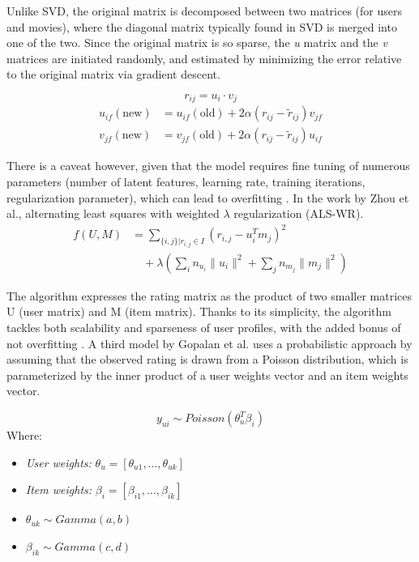 \documentclass[conference]{IEEEtran}
\begin{document}
Unlike SVD, the original matrix is decomposed between two matrices (for users and movies), where the diagonal matrix typically found in SVD is merged into one of the two. Since the original matrix is so sparse, the \textit{u} matrix and the \textit{v} matrices are initiated randomly, and estimated by minimizing the error relative to the original matrix via gradient descent.

\begin{equation}
r_{ij} = u_i \cdot v_j
\end{equation}
\begin{align}
u_{if}(\text{new}) &= u_{if}(\text{old}) + 2\alpha(r_{ij} - \tilde{r}_{ij})v_{jf} \\
v_{jf}(\text{new}) &= v_{jf}(\text{old}) + 2\alpha(r_{ij} - \tilde{r}_{ij})u_{if}
\end{align}

There is a caveat however, given that the model requires fine tuning of numerous parameters (number of latent features, learning rate, training iterations, regularization parameter), which can lead to overfitting \cite{Funk2006}. In the work by Zhou et al., alternating least squares with weighted  $\lambda$ regularization (ALS-WR). 
\begin{align}
f(U, M) &= \sum_{\{i, j\} | r_{i,j} \in I} \left( r_{i,j} - u_i^T m_j \right)^2 \nonumber \\
&\quad + \lambda \left( \sum_i n_{u_i} \| u_i \|^2 + \sum_j n_{m_j} \| m_j \|^2 \right)
\end{align}

The algorithm expresses the rating matrix as the product of two smaller matrices U (user matrix) and M (item matrix). Thanks to its simplicity, the algorithm tackles both scalability and sparseness of user profiles, with the added bonus of not overfitting \cite{10.1007/978-3-540-68880-8_32}. A third model by Gopalan et al. uses a probabilistic approach by assuming that the observed rating is drawn from a Poisson distribution, which is parameterized by the inner product of a user weights vector and an item weights vector.

\begin{equation}
y_{ui} \sim Poisson(\theta_u^T \beta_i)
\end{equation}
\noindent
Where:
\begin{itemize}
    \renewcommand{\labelitemi}{~} %
    \item \textit{User weights:} $\theta_u = [\theta_{u1}, \dots, \theta_{uk}]$
    \item \textit{Item weights:} $\beta_i = [\beta_{i1}, \dots, \beta_{ik}]$
    \item $\theta_{uk} \sim Gamma(a, b)$
    \item $\beta_{ik} \sim Gamma(c, d)$
\end{itemize}
\end{document}
